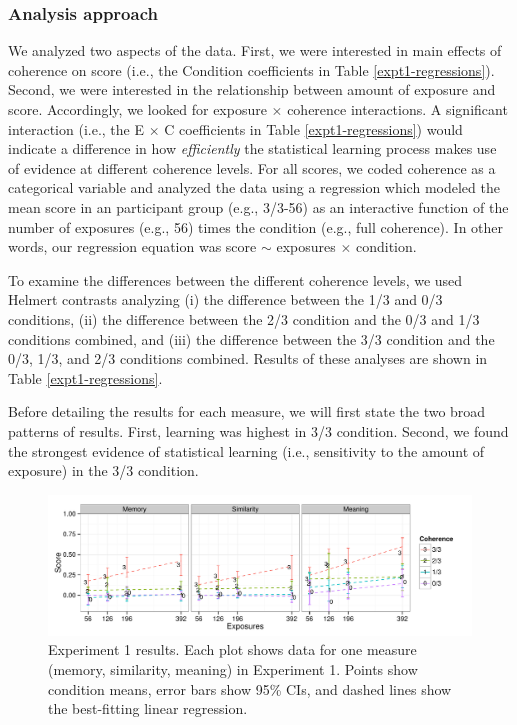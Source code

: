 \documentclass[man,floatsintext]{apa6}
\begin{document}
\subsubsection{Analysis approach}
We analyzed two aspects of the data. First, we were interested in main effects of coherence on score (i.e., the Condition coefficients in Table \ref{expt1-regressions}). Second, we were interested in the relationship between amount of exposure and score. Accordingly, we looked for exposure $\times$ coherence interactions. A significant interaction (i.e., the E $\times$ C coefficients in Table \ref{expt1-regressions}) would indicate a difference in how \emph{efficiently} the statistical learning process makes use of evidence at different coherence levels. For all scores, we coded coherence as a categorical variable and analyzed the data using a regression which modeled the mean score in an participant group (e.g., 3/3-56) as an interactive function of the number of exposures (e.g., 56) times the condition (e.g., full coherence). In other words, our regression equation was score $\sim$ exposures $\times$ condition.

To examine the differences between the different coherence levels, we used Helmert contrasts analyzing (i) the difference between the 1/3 and 0/3 conditions, (ii) the difference between the 2/3 condition and the 0/3 and 1/3 conditions combined, and (iii) the difference between the 3/3 condition and the 0/3, 1/3, and 2/3 conditions combined. Results of these analyses are shown in Table \ref{expt1-regressions}.

Before detailing the results for each measure, we will first state the two broad patterns of results. First, learning was highest in 3/3 condition. Second, we found the strongest evidence of statistical learning (i.e., sensitivity to the amount of exposure) in the 3/3 condition.

\begin{figure}[t]
  \begin{center}
    \includegraphics[width=1.0\linewidth]{x1.pdf}
    \caption{Experiment 1 results. Each plot shows data for one
measure (memory, similarity, meaning) in Experiment 1. Points show
condition means, error bars show 95\% CIs, and dashed lines show the
best-fitting linear regression.}
    \label{expt1-results}
  \end{center}
\end{figure}
\end{document}
